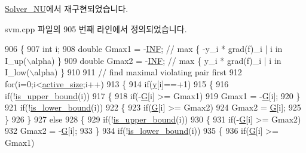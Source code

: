 \hyperlink{class_solver___n_u_a6670a539940f4efdc40d2c9e75a9da1b}{Solver\+\_\+\+N\+U}에서 재구현되었습니다.



svm.\+cpp 파일의 905 번째 라인에서 정의되었습니다.


\begin{DoxyCode}
906 \{
907     \textcolor{keywordtype}{int} i;
908     \textcolor{keywordtype}{double} Gmax1 = -\hyperlink{svm_8cpp_a12c2040f25d8e3a7b9e1c2024c618cb6}{INF};     \textcolor{comment}{// max \{ -y\_i * grad(f)\_i | i in I\_up(\(\backslash\)alpha) \}}
909     \textcolor{keywordtype}{double} Gmax2 = -\hyperlink{svm_8cpp_a12c2040f25d8e3a7b9e1c2024c618cb6}{INF};     \textcolor{comment}{// max \{ y\_i * grad(f)\_i | i in I\_low(\(\backslash\)alpha) \}}
910 
911     \textcolor{comment}{// find maximal violating pair first}
912     \textcolor{keywordflow}{for}(i=0;i<\hyperlink{class_solver_a06ba1b87b3749cc545e573151b7beca0}{active\_size};i++)
913     \{
914         \textcolor{keywordflow}{if}(\hyperlink{class_solver_a3acc1043d06dedf87f054ff3eea5c426}{y}[i]==+1)   
915         \{
916             \textcolor{keywordflow}{if}(!\hyperlink{class_solver_a98d878b13d6f710fcaa0b16e657a37b6}{is\_upper\_bound}(i))    
917             \{
918                 \textcolor{keywordflow}{if}(-\hyperlink{class_solver_ad8ab27068f2e045591970aae1201afe9}{G}[i] >= Gmax1)
919                     Gmax1 = -\hyperlink{class_solver_ad8ab27068f2e045591970aae1201afe9}{G}[i];
920             \}
921             \textcolor{keywordflow}{if}(!\hyperlink{class_solver_a5876eedb0a6de6954f6037af0992cbed}{is\_lower\_bound}(i))    
922             \{
923                 \textcolor{keywordflow}{if}(\hyperlink{class_solver_ad8ab27068f2e045591970aae1201afe9}{G}[i] >= Gmax2)
924                     Gmax2 = \hyperlink{class_solver_ad8ab27068f2e045591970aae1201afe9}{G}[i];
925             \}
926         \}
927         \textcolor{keywordflow}{else}    
928         \{
929             \textcolor{keywordflow}{if}(!\hyperlink{class_solver_a98d878b13d6f710fcaa0b16e657a37b6}{is\_upper\_bound}(i))    
930             \{
931                 \textcolor{keywordflow}{if}(-\hyperlink{class_solver_ad8ab27068f2e045591970aae1201afe9}{G}[i] >= Gmax2)
932                     Gmax2 = -\hyperlink{class_solver_ad8ab27068f2e045591970aae1201afe9}{G}[i];
933             \}
934             \textcolor{keywordflow}{if}(!\hyperlink{class_solver_a5876eedb0a6de6954f6037af0992cbed}{is\_lower\_bound}(i))    
935             \{
936                 \textcolor{keywordflow}{if}(\hyperlink{class_solver_ad8ab27068f2e045591970aae1201afe9}{G}[i] >= Gmax1)

\end{DoxyCode}
